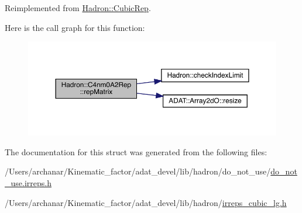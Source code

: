 Reimplemented from \mbox{\hyperlink{structHadron_1_1CubicRep_ac5d7e9e6f4ab1158b5fce3e4ad9e8005}{Hadron\+::\+Cubic\+Rep}}.

Here is the call graph for this function\+:
\nopagebreak
\begin{figure}[H]
\begin{center}
\leavevmode
\includegraphics[width=350pt]{d2/db9/structHadron_1_1C4nm0A2Rep_aac52fe57a274d94bbaef9c6b2699e1c9_cgraph}
\end{center}
\end{figure}


The documentation for this struct was generated from the following files\+:\begin{DoxyCompactItemize}
\item 
/\+Users/archanar/\+Kinematic\+\_\+factor/adat\+\_\+devel/lib/hadron/do\+\_\+not\+\_\+use/\mbox{\hyperlink{do__not__use_8irreps_8h}{do\+\_\+not\+\_\+use.\+irreps.\+h}}\item 
/\+Users/archanar/\+Kinematic\+\_\+factor/adat\+\_\+devel/lib/hadron/\mbox{\hyperlink{lib_2hadron_2irreps__cubic__lg_8h}{irreps\+\_\+cubic\+\_\+lg.\+h}}\end{DoxyCompactItemize}
